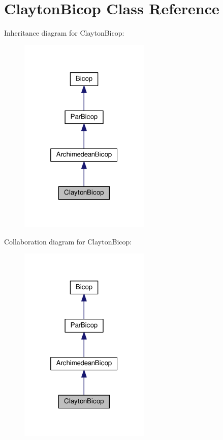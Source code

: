 \hypertarget{class_clayton_bicop}{\section{Clayton\+Bicop Class Reference}
\label{class_clayton_bicop}
}


Inheritance diagram for Clayton\+Bicop\+:\nopagebreak
\begin{figure}[H]
\begin{center}
\leavevmode
\includegraphics[width=176pt]{class_clayton_bicop__inherit__graph}
\end{center}
\end{figure}


Collaboration diagram for Clayton\+Bicop\+:\nopagebreak
\begin{figure}[H]
\begin{center}
\leavevmode
\includegraphics[width=176pt]{class_clayton_bicop__coll__graph}
\end{center}
\end{figure}
